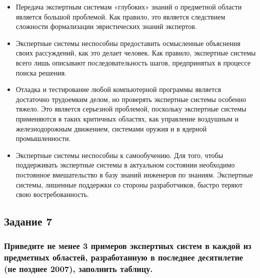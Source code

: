\documentclass[14pt,a4paper,report]{report}
\begin{document}
\begin{itemize}
	\item Передача экспертным системам «глубоких» знаний о предметной области является большой проблемой. Как правило, это является следствием сложности формализации эвристических знаний экспертов.
	\item Экспертные системы неспособны предоставить осмысленные объяснения своих рассуждений, как это делает человек. Как правило, экспертные системы всего лишь описывают последовательность шагов, предпринятых в процессе поиска решения.
	\item Отладка и тестирование любой компьютерной программы является достаточно трудоемким делом, но проверять экспертные системы особенно тяжело. Это является серьезной проблемой, поскольку экспертные системы применяются в таких критичных областях, как управление воздушным и железнодорожным движением, системами оружия и в ядерной промышленности.
	\item Экспертные системы неспособны к самообучению. Для того, чтобы поддерживать экспертные системы в актуальном состоянии необходимо постоянное вмешательство в базу знаний инженеров по знаниям. Экспертные системы, лишенные поддержки со стороны разработчиков, быстро теряют свою востребованность.
\end{itemize}

\clearpage

\subsection{Задание 7}

\subsubsection{Приведите не менее 3 примеров экспертных систем в каждой из предметных областей, разработанную в последнее десятилетие (не позднее 2007), заполнить таблицу.}
\end{document}
